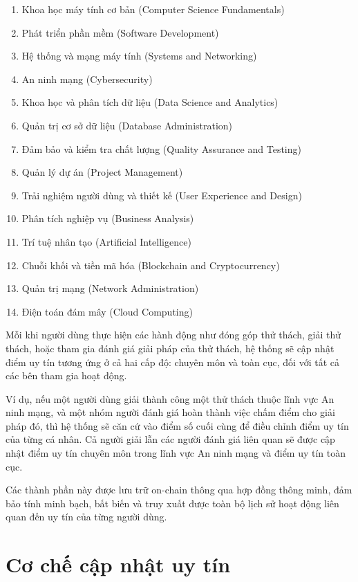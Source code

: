 \begin{enumerate}
  \item Khoa học máy tính cơ bản (Computer Science Fundamentals)
  \item Phát triển phần mềm (Software Development)
  \item Hệ thống và mạng máy tính (Systems and Networking)
  \item An ninh mạng (Cybersecurity)
  \item Khoa học và phân tích dữ liệu (Data Science and Analytics)
  \item Quản trị cơ sở dữ liệu (Database Administration)
  \item Đảm bảo và kiểm tra chất lượng (Quality Assurance and Testing)
  \item Quản lý dự án (Project Management)
  \item Trải nghiệm người dùng và thiết kế (User Experience and Design)
  \item Phân tích nghiệp vụ (Business Analysis)
  \item Trí tuệ nhân tạo (Artificial Intelligence)
  \item Chuỗi khối và tiền mã hóa (Blockchain and Cryptocurrency)
  \item Quản trị mạng (Network Administration)
  \item Điện toán đám mây (Cloud Computing)
\end{enumerate}

Mỗi khi người dùng thực hiện các hành động như đóng góp thử thách, giải thử thách, hoặc tham gia đánh giá giải pháp của thử thách, hệ thống sẽ cập nhật điểm uy tín tương ứng ở cả hai cấp độ: chuyên môn và toàn cục, đối với tất cả các bên tham gia hoạt động.

Ví dụ, nếu một người dùng giải thành công một thử thách thuộc lĩnh vực An ninh mạng, và một nhóm người đánh giá hoàn thành việc chấm điểm cho giải pháp đó, thì hệ thống sẽ căn cứ vào điểm số cuối cùng để điều chỉnh điểm uy tín của từng cá nhân.
Cả người giải lẫn các người đánh giá liên quan sẽ được cập nhật điểm uy tín chuyên môn trong lĩnh vực An ninh mạng và điểm uy tín toàn cục.

Các thành phần này được lưu trữ on-chain thông qua hợp đồng thông minh, đảm bảo tính minh bạch, bất biến và truy xuất được toàn bộ lịch sử hoạt động liên quan đến uy tín của từng người dùng.

\section{Cơ chế cập nhật uy tín}


